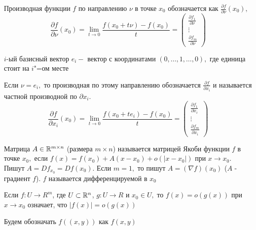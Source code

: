\begin{remark}
	Производная функции $f$ по направлению $\nu$ в точке $x_0$ обозначается как $\frac{\partial f}{\partial \nu}(x_0),$
	\[ \frac{\partial f}{\partial \nu}(x_0) =  \lim_{t\to0}\frac{f(x_0 + t\nu) - f(x_0)}{t} = \begin{pmatrix}
  \frac{\partial f_1}{\partial \nu} \\
  \vdots \\
  \frac{\partial f_m}{\partial \nu}
 \end{pmatrix} \]
\end{remark}

\begin{definition}
	$i$-ый базисный вектор $e_i -$ вектор с координатами $(0,\ldots, 1, \ldots, 0),$ где единица стоит на $i$"=ом месте
\end{definition}

\begin{remark}
	Если $\nu = e_i,$ то производная по этому направлению обозначается $\frac{\partial f}{\partial x_i}$ и называется частной производной по $\partial x_i$.
	\[ \frac{\partial f}{\partial x_i}(x_0) =  \lim_{t\to0}\frac{f(x_0 + t e_i) - f(x_0)}{t} = \begin{pmatrix}
	  \frac{\partial f_1}{\partial x_i} \\
	  \vdots \\
	  \frac{\partial f_m}{\partial x_i}
	 \end{pmatrix} \]
\end{remark}

\begin{definition}
	Матрица $A \in \mathbb{R}^{m\times n}$ (размера $m\times n$) называется матрицей Якоби функции $f$ в точке $x_0,$ если $f(x) = f(x_0) + A(x-x_0) + o(|x-x_0|)$ при $x \to x_0$. Пишут $A = Df_{x_0} = Df(x_0)$. Если $m = 1,$ то пишут $A = (\nabla f)(x_0)$ ($A$ - градиент $f$). $f$ называется дифференцируемой в $x_0$
\end{definition}

\begin{remark}
	Если $f : U \to R^m$, где $U \subset \mathbb{R}^n$, $g : U \to R$ и $x_0 \in U,$ то $f(x) = o(g(x))$ при $x \to x_0$ означает, что $|f(x)| = o(g(x))$
\end{remark}

\begin{remark}
	Будем обозначать $f((x,y))$ как $f(x,y)$
\end{remark}

